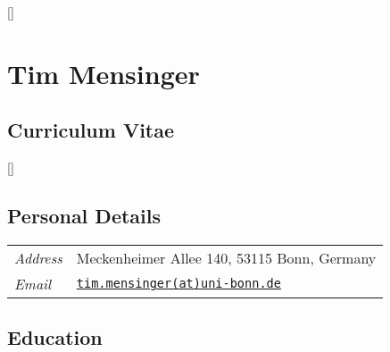 \documentclass{article}
\begin{document}
\thispagestyle{empty}
\renewcommand\labelitemi{\tiny$\bullet$}

\titlespacing*{\section}{0pt}{0pt}{0pt}
\titlespacing*{\subsection}{0pt}{0pt}{0pt}

\titleformat{\section}{\normalfont\Large\bfseries}{\thesection}{1em}{}[{\titlerule[0.8pt]}]


\section*{\hfill \LARGE Tim Mensinger}\vspace*{3pt}
\subsection*{\hfill Curriculum Vitae}

\titleformat{\subsection}{\normalfont\bfseries}{\thesection}{1em}{}[{\titlerule[0.4pt]}]

\vspace{15pt}
\subsection*{Personal Details}

\begin{table}[h!]
    \renewcommand{\arraystretch}{1.4}
    \begin{tabular}{p{110pt} p{350pt}}
         \textit{Address} &  Meckenheimer Allee 140, 53115 Bonn, Germany\\
         \textit{Email} & \href{mailto:tim.mensinger@uni-bonn.de}{\texttt{tim.mensinger(at)uni-bonn.de}}
    \end{tabular}
\end{table}


\subsection*{Education}
\end{document}
